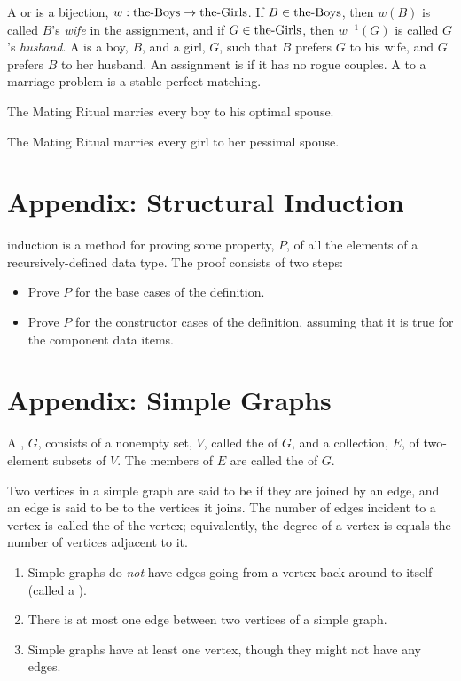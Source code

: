 \documentclass[handout]{mcs}
\begin{document}
A  or  is a bijection,
$w:\text{the-Boys} \to \text{the-Girls}$.  If $B \in \text{the-Boys}$, then $w(B)$ is called $B$'s
\emph{wife} in the assignment, and if $G \in \text{the-Girls}$, then $w^{-1}(G)$ is
called $G$'s \emph{husband}.  A  is a boy, $B$, and a
girl, $G$, such that $B$ prefers $G$ to his wife, and $G$ prefers $B$ to
her husband.  An assignment is  if it has no rogue couples.
A  to a marriage problem is a stable perfect matching.

The Mating Ritual marries every boy to his optimal spouse.

The Mating Ritual marries every girl to her pessimal spouse.

\section*{Appendix: Structural Induction}

 induction is a method for proving
some property, $P$, of all the elements of a recursively-defined data
type.  The proof consists of two steps:
\begin{itemize}
\item Prove $P$ for the base cases of the definition. 
\item Prove $P$ for the constructor cases of the definition, assuming that it
  is true for the component data items.  
\end{itemize}

\section*{Appendix: Simple Graphs}

A , $G$, consists of a nonempty set, $V$, called the
 of $G$, and a collection, $E$, of two-element subsets of
$V$.  The members of $E$ are called the  of $G$.

Two vertices in a simple graph are said to be  if they are
joined by an edge, and an edge is said to be  to the
vertices it joins.  The number of edges incident to a vertex is called the
 of the vertex; equivalently, the degree of a vertex is
equals the number of vertices adjacent to it.

\begin{enumerate}
\item Simple graphs do \emph{not} have edges going from a vertex back
  around to itself (called a ).

\item There is at most one edge between two vertices of a simple graph.

\item Simple graphs have at least one vertex, though they might not have
any edges.
\end{enumerate}
\end{document}
